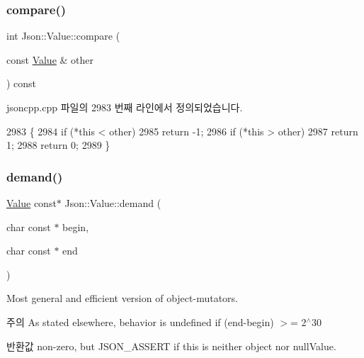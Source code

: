 \subsubsection{\texorpdfstring{compare()}{compare()}}
{\footnotesize\ttfamily int Json\+::\+Value\+::compare (\begin{DoxyParamCaption}\item[{const \hyperlink{class_json_1_1_value}{Value} \&}]{other }\end{DoxyParamCaption}) const}



jsoncpp.\+cpp 파일의 2983 번째 라인에서 정의되었습니다.


\begin{DoxyCode}
2983                                            \{
2984   \textcolor{keywordflow}{if} (*\textcolor{keyword}{this} < other)
2985     \textcolor{keywordflow}{return} -1;
2986   \textcolor{keywordflow}{if} (*\textcolor{keyword}{this} > other)
2987     \textcolor{keywordflow}{return} 1;
2988   \textcolor{keywordflow}{return} 0;
2989 \}
\end{DoxyCode}
\mbox{\label{class_json_1_1_value_afeb7ff596a0929d90c5f2f3cffb413ed}} 
\subsubsection{\texorpdfstring{demand()}{demand()}}
{\footnotesize\ttfamily \hyperlink{class_json_1_1_value}{Value} const$\ast$ Json\+::\+Value\+::demand (\begin{DoxyParamCaption}\item[{char const $\ast$}]{begin,  }\item[{char const $\ast$}]{end }\end{DoxyParamCaption})}

Most general and efficient version of object-\/mutators. \begin{DoxyNote}{주의}
As stated elsewhere, behavior is undefined if (end-\/begin) $>$= 2$^\wedge$30 
\end{DoxyNote}
\begin{DoxyReturn}{반환값}
non-\/zero, but J\+S\+O\+N\+\_\+\+A\+S\+S\+E\+RT if this is neither object nor null\+Value. 
\end{DoxyReturn}
\mbox{\label{class_json_1_1_value_a0519a551e37ee6665d74742b3f96bab3}} 
